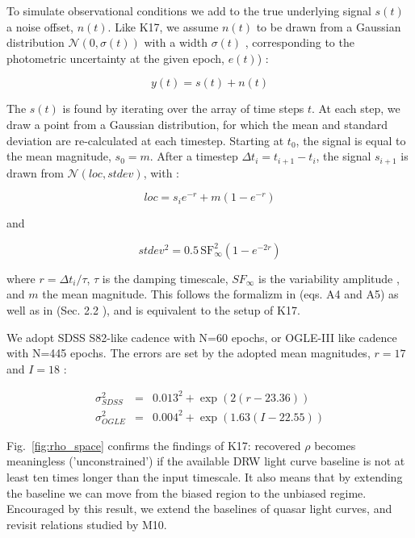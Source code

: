 \documentclass[twocolumn]{aastex62}
\begin{document}
To simulate observational conditions  we add to the true underlying signal  $s(t)$ a noise offset, $n(t)$.  Like K17,  we assume $n(t)$ to be drawn from a Gaussian distribution $\mathcal{N}(0,\sigma(t))$ with a width $\sigma(t)$ , corresponding to the  photometric uncertainty at the given epoch,  $e(t)$) : 

\begin{equation}
y(t) = s(t) + n(t) 
\end{equation}

The $s(t)$ is found by iterating over the array of time steps $t$.  At each step, we draw a point from a Gaussian distribution, for which the mean and standard deviation are re-calculated at each timestep. Starting at $t_{0}$, the signal is equal to the mean magnitude, $s_{0} = m$. After a timestep $\Delta t_{i} = t_{i+1} - t_{i}$, the signal $s_{i+1}$ is drawn from  $\mathcal{N}(loc, stdev)$, with : 

\begin{equation}
loc = s_{i} e ^ { - r  }  + m \left( 1 - e ^{ - r }\right)
\end{equation}

and 

\begin{equation}
stdev^{2} =  0.5  \, \mathrm{SF}_{\infty}^{2} \left( 1 - e ^{  - 2 r  }  \right)
\end{equation}

where  $r = \Delta t_{i} / \tau$, $\tau$ is the damping timescale,   $SF_{\infty}$ is the  variability amplitude , and $m$ the mean magnitude.  This follows the formalizm in \cite{kelly2009} (eqs. A4 and A5) as well as in \cite{macleod2010} (Sec. 2.2 ), and is equivalent to the setup of  K17. 


We adopt SDSS S82-like cadence with N=60 epochs, or OGLE-III like cadence with N=445 epochs.  The errors are set by the adopted mean magnitudes, $r=17$ and $I=18$ :

\begin{eqnarray}
\sigma_{SDSS}^{2} &=& 0.013^{2} + \exp{(2 (r-23.36))} \\
\sigma_{OGLE}^{2} &=& 0.004^{2} + \exp{(1.63 (I - 22.55))}
\end{eqnarray}



Fig.~\ref{fig:rho_space} confirms the findings of K17:  recovered $\rho$ becomes meaningless ('unconstrained') if the available DRW light curve baseline is not at least ten times longer than the input timescale. It also means that by extending the baseline we can move from the biased region to the unbiased regime.  Encouraged by this result, we extend the baselines of  quasar light curves, and revisit relations studied by  M10. 
\end{document}

